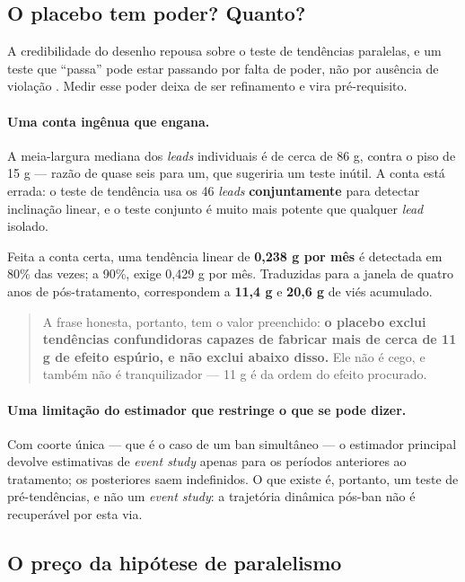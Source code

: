\subsection{O placebo tem poder? Quanto?}
\label{sub:pretrends}

A credibilidade do desenho repousa sobre o teste de tendências paralelas, e um
teste que ``passa'' pode estar passando por falta de poder, não por ausência de
violação \citep{roth2023trending}. Medir esse poder deixa de ser refinamento e
vira pré-requisito.

\paragraph{Uma conta ingênua que engana.}
A meia-largura mediana dos \emph{leads} individuais é de cerca de 86 g, contra o
piso de 15 g --- razão de quase seis para um, que sugeriria um teste inútil. A
conta está errada: o teste de tendência usa os 46 \emph{leads}
\textbf{conjuntamente} para detectar inclinação linear, e o teste conjunto é
muito mais potente que qualquer \emph{lead} isolado.

Feita a conta certa, uma tendência linear de \textbf{0,238 g por mês} é
detectada em 80\% das vezes; a 90\%, exige 0,429 g por mês. Traduzidas para a
janela de quatro anos de pós-tratamento, correspondem a \textbf{11,4 g} e
\textbf{20,6 g} de viés acumulado.

\begin{quote}
A frase honesta, portanto, tem o valor preenchido: \textbf{o placebo exclui
tendências confundidoras capazes de fabricar mais de cerca de 11 g de efeito
espúrio, e não exclui abaixo disso.} Ele não é cego, e também não é
tranquilizador --- 11 g é da ordem do efeito procurado.
\end{quote}

\paragraph{Uma limitação do estimador que restringe o que se pode dizer.}
Com coorte única --- que é o caso de um ban simultâneo --- o estimador principal
devolve estimativas de \emph{event study} apenas para os períodos anteriores ao
tratamento; os posteriores saem indefinidos. O que existe é, portanto, um teste
de pré-tendências, e não um \emph{event study}: a trajetória dinâmica pós-ban
não é recuperável por esta via.

\subsection{O preço da hipótese de paralelismo}
\label{sub:honestdid}

